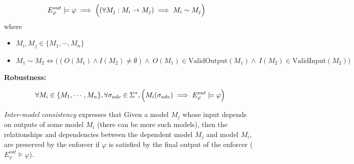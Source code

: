 \begin{definition}
 \begin{equation*}
 \begin{aligned}
 E^{out}_{\varphi} \models \varphi &\implies 
 \Bigl( (\forall M_j: M_i \rightarrow M_j) \implies M_i \sim M_j \Bigr) 
 \end{aligned}
 \end{equation*}
 where
 \begin{itemize}
        \item[-] $M_i, M_j \in \{M_1, \cdots, M_n\}$
        \item[-] $M_1 \sim M_2 \iff \bigl( (O(M_1) \land I(M_2) \neq \emptyset) \land~O(M_1) \in \text{ValidOutput}(M_1)  \land~I(M_2) \in \text{ValidInput}(M_2) \bigr)$
 \end{itemize} 
 \begin{flushleft}
 \textbf{Robustness:}
 \end{flushleft}
 \begin{equation*}
        \label{eq:ro}            
 \forall M_i \in \{M_1, \cdots, M_n\}, \forall \sigma_{adv} \in \Sigma^{\ast}, 
 \Bigl(M_i(\sigma_{adv})  \implies E^{out}_{\varphi} \models \varphi \Bigr)
 \end{equation*}
    \label{constraints3}
\end{definition}


\textit{Inter-model consistency} expresses that %
Given a model $M_j$ whose input depends on outputs of some model $M_i$ (there can be more such models), then the relationships and dependencies between the dependent model $M_j$ and model $M_i$, are preserved by the enforcer if $\varphi$ is satisfied by the final output of the enforcer ($E^{out}_{\varphi} \models \varphi$). 

